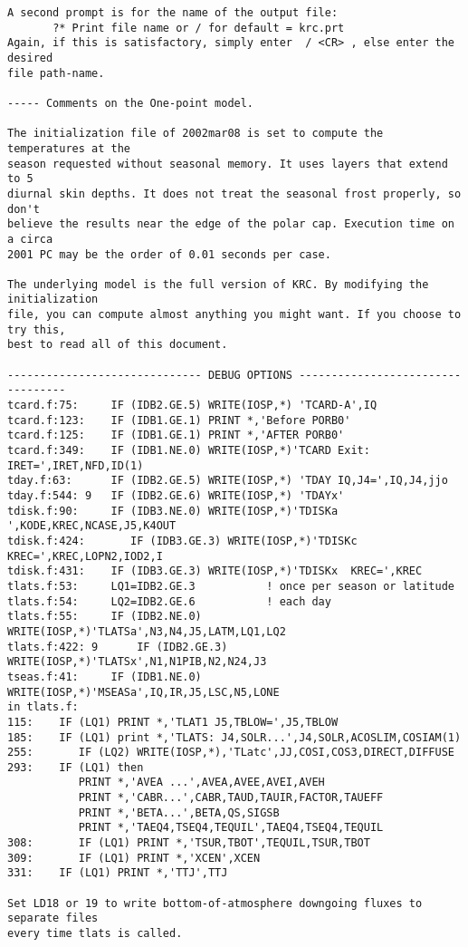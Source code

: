 \begin{verbatim}
A second prompt is for the name of the output file: 
       ?* Print file name or / for default = krc.prt
Again, if this is satisfactory, simply enter  / <CR> , else enter the desired
file path-name.

----- Comments on the One-point model. 

The initialization file of 2002mar08 is set to compute the temperatures at the
season requested without seasonal memory. It uses layers that extend to 5
diurnal skin depths. It does not treat the seasonal frost properly, so don't
believe the results near the edge of the polar cap. Execution time on a circa
2001 PC may be the order of 0.01 seconds per case.

The underlying model is the full version of KRC. By modifying the initialization
file, you can compute almost anything you might want. If you choose to try this,
best to read all of this document.

------------------------------ DEBUG OPTIONS ----------------------------------
tcard.f:75:     IF (IDB2.GE.5) WRITE(IOSP,*) 'TCARD-A',IQ
tcard.f:123:    IF (IDB1.GE.1) PRINT *,'Before PORB0'
tcard.f:125:    IF (IDB1.GE.1) PRINT *,'AFTER PORB0'
tcard.f:349:    IF (IDB1.NE.0) WRITE(IOSP,*)'TCARD Exit: IRET=',IRET,NFD,ID(1) 
tday.f:63:      IF (IDB2.GE.5) WRITE(IOSP,*) 'TDAY IQ,J4=',IQ,J4,jjo
tday.f:544: 9   IF (IDB2.GE.6) WRITE(IOSP,*) 'TDAYx'
tdisk.f:90:     IF (IDB3.NE.0) WRITE(IOSP,*)'TDISKa ',KODE,KREC,NCASE,J5,K4OUT
tdisk.f:424:       IF (IDB3.GE.3) WRITE(IOSP,*)'TDISKc  KREC=',KREC,LOPN2,IOD2,I
tdisk.f:431:    IF (IDB3.GE.3) WRITE(IOSP,*)'TDISKx  KREC=',KREC
tlats.f:53:     LQ1=IDB2.GE.3           ! once per season or latitude
tlats.f:54:     LQ2=IDB2.GE.6           ! each day
tlats.f:55:     IF (IDB2.NE.0) WRITE(IOSP,*)'TLATSa',N3,N4,J5,LATM,LQ1,LQ2
tlats.f:422: 9      IF (IDB2.GE.3) WRITE(IOSP,*)'TLATSx',N1,N1PIB,N2,N24,J3
tseas.f:41:     IF (IDB1.NE.0) WRITE(IOSP,*)'MSEASa',IQ,IR,J5,LSC,N5,LONE
in tlats.f:
115:    IF (LQ1) PRINT *,'TLAT1 J5,TBLOW=',J5,TBLOW
185:    IF (LQ1) print *,'TLATS: J4,SOLR...',J4,SOLR,ACOSLIM,COSIAM(1)
255:       IF (LQ2) WRITE(IOSP,*),'TLatc',JJ,COSI,COS3,DIRECT,DIFFUSE 
293:    IF (LQ1) then 
           PRINT *,'AVEA ...',AVEA,AVEE,AVEI,AVEH
           PRINT *,'CABR...',CABR,TAUD,TAUIR,FACTOR,TAUEFF
           PRINT *,'BETA...',BETA,QS,SIGSB 
           PRINT *,'TAEQ4,TSEQ4,TEQUIL',TAEQ4,TSEQ4,TEQUIL
308:       IF (LQ1) PRINT *,'TSUR,TBOT',TEQUIL,TSUR,TBOT
309:       IF (LQ1) PRINT *,'XCEN',XCEN 
331:    IF (LQ1) PRINT *,'TTJ',TTJ

Set LD18 or 19 to write bottom-of-atmosphere downgoing fluxes to separate files
every time tlats is called.
 

\end{verbatim}
